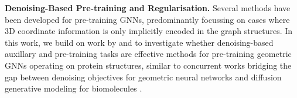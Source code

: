 \textbf{Denoising-Based Pre-training and Regularisation. } 
Several methods have been developed for pre-training GNNs, predominantly focussing on cases where 3D coordinate information is only implicitly encoded in the graph structures. In this work, we build on work by \citet{godwin2021simple} and \citet{zaidi2023pretraining} to investigate whether denoising-based auxillary and pre-training tasks are effective methods for pre-training geometric GNNs operating on protein structures, similar to concurrent works bridging the gap between denoising objectives for geometric neural networks and diffusion generative modeling for biomolecules \citep{huang2023data, corso2023modeling}.
